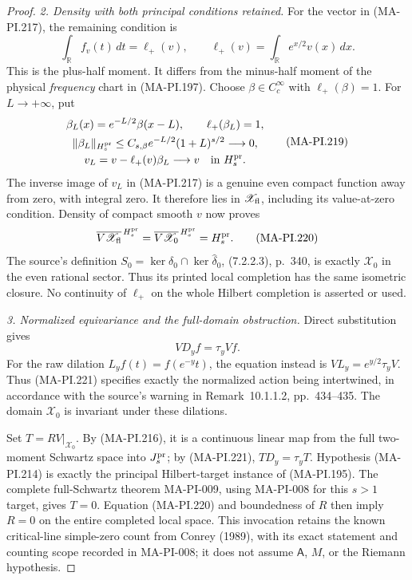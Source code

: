 \begin{proof}
\emph{2. Density with both principal conditions retained.}
For the vector in (MA-PI.217), the remaining condition is
\[
 \int_{\mathbb R}f_v(t)\,dt
     =\ell_+(v),\qquad
 \ell_+(v)=\int_{\mathbb R}e^{x/2}v(x)\,dx.
 \tag{MA-PI.218}
\]
This is the plus-half moment.  It differs from the minus-half
moment of the physical \emph{frequency} chart in (MA-PI.197).
Choose \(\beta\in C_c^\infty\) with \(\ell_+(\beta)=1\).
For \(L\to+\infty\), put
\[
 \begin{gathered}
 \beta_L(x)=e^{-L/2}\beta(x-L),\qquad
 \ell_+(\beta_L)=1,\\
 \|\beta_L\|_{H_s^{\rm pr}}
       \le C_{s,\beta}e^{-L/2}(1+L)^{s/2}\longrightarrow0,\\
 v_L=v-\ell_+(v)\beta_L\longrightarrow v
                                      \quad\text{in }H_s^{\rm pr}.
 \end{gathered}
 \tag{MA-PI.219}
\]
The inverse image of \(v_L\) in (MA-PI.217) is a genuine
even compact function away from zero, with integral zero.
It therefore lies in \(\mathscr X_{\rm fl}\), including its
value-at-zero condition.  Density of compact smooth \(v\)
now proves
\[
 \overline{V\mathscr X_{\rm fl}}^{\,H_s^{\rm pr}}
   =\overline{V\mathscr X_0}^{\,H_s^{\rm pr}}
   =H_s^{\rm pr}.
 \tag{MA-PI.220}
\]
The source's definition \(S_0=\ker\delta_0\cap\ker\widehat\delta_0\),
(7.2.2.3), p.~340, is exactly \(\mathscr X_0\) in the even
rational sector.  Thus its printed local completion has
the same isometric closure.  No continuity of \(\ell_+\)
on the whole Hilbert completion is asserted or used.

\emph{3. Normalized equivariance and the full-domain obstruction.}
Direct substitution gives
\[
       VD_yf=\tau_yVf.
 \tag{MA-PI.221}
\]
For the raw dilation \(L_yf(t)=f(e^{-y}t)\), the equation
instead is \(VL_y=e^{y/2}\tau_yV\).  Thus (MA-PI.221)
specifies exactly the normalized action being intertwined,
in accordance with the source's warning in Remark~10.1.1.2,
pp.~434--435.  The domain \(\mathscr X_0\) is invariant
under these dilations.

Set \(T=RV|_{\mathscr X_0}\).  By (MA-PI.216), it is a
continuous linear map from the full two-moment Schwartz
space into \(J_s^{\rm pr}\); by (MA-PI.221),
\(TD_y=\tau_yT\).  Hypothesis (MA-PI.214) is exactly the
principal Hilbert-target instance of (MA-PI.195).
The complete full-Schwartz theorem MA-PI-009, using
MA-PI-008 for this \(s>1\) target, gives \(T=0\).
Equation (MA-PI.220) and boundedness of \(R\) then imply
\(R=0\) on the entire completed local space.
This invocation retains the known critical-line simple-zero
count from Conrey (1989), with its exact statement and
counting scope recorded in MA-PI-008; it does not assume
\(\mathsf A\), \(M\), or the Riemann hypothesis.


\end{proof}
